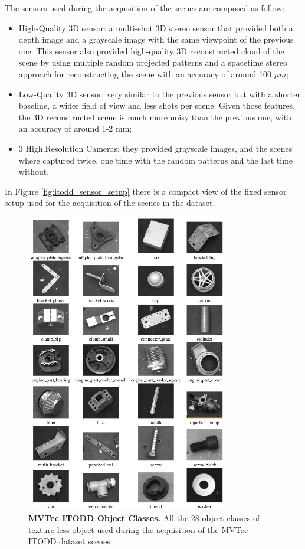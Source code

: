 The sensors used during the acquisition of the scenes are composed as follow:

\begin{itemize}
	\item High-Quality 3D sensor: a multi-shot 3D stereo sensor that provided both a depth image and a grayscale image with the same viewpoint of the previous one. This sensor also provided high-quality 3D reconstructed cloud of the scene by using multiple random projected patterns and a spacetime stereo approach for reconstructing the scene with an accuracy of around 100 $\mu m$;
	\item Low-Quality 3D sensor: very similar to the previous sensor but with a shorter baseline, a wider field of view and less shots per scene. Given those features, the 3D reconstructed scene is much more noisy than the previous one, with an accuracy of around 1-2 mm;
	\item 3 High.Resolution Cameras: they provided grayscale images, and the scenes where captured twice, one time with the random patterns and the last time without. 
\end{itemize}

In Figure \ref{fig:itodd_sensor_setup} there is a compact view of the fixed sensor setup used for the acquisition of the scenes in the dataset.

\begin{figure}
    \centering
    \includegraphics[width=0.8\textwidth]{figures/2_benchmarks_and_metrics/itodd_object_examples}
    \caption{\textbf{MVTec ITODD Object Classes.} All the 28 object classes of texture-less object used during the acquisition of the MVTec ITODD dataset scenes.}
    \label{fig:itodd_object_examples}
\end{figure}

